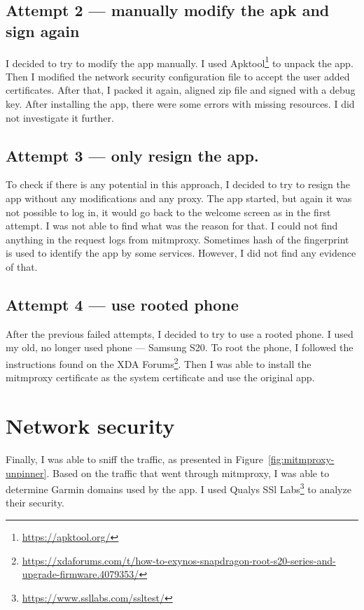 \subsection*{Attempt 2 — manually modify the apk and sign again}

I decided to try to modify the app manually.
I used Apktool\footnote{\url{https://apktool.org/}} to unpack the app.
Then I modified the network security configuration file to accept the user added certificates.
After that, I packed it again, aligned zip file and signed with a debug key.
After installing the app, there were some errors with missing resources.
I did not investigate it further.

\subsection*{Attempt 3 — only resign the app.}

To check if there is any potential in this approach, I decided to try to resign the app without any modifications and any proxy.
The app started, but again it was not possible to log in, it would go back to the welcome screen as in the first attempt.
I was not able to find what was the reason for that.
I could not find anything in the request logs from mitmproxy.
Sometimes hash of the fingerprint is used to identify the app by some services.
However, I did not find any evidence of that.

\subsection*{Attempt 4 — use rooted phone}
After the previous failed attempts, I decided to try to use a rooted phone.
I used my old, no longer used phone — Samsung S20.
To root the phone, I followed the instructions found on the XDA Forums\footnote{\url{https://xdaforums.com/t/how-to-exynos-snapdragon-root-s20-series-and-upgrade-firmware.4079353/}}.
Then I was able to install the mitmproxy certificate as the system certificate and use the original app.

\section{Network security}
Finally, I was able to sniff the traffic, as presented in Figure~\ref{fig:mitmproxy-unpinner}.
Based on the traffic that went through mitmproxy, I was able to determine Garmin domains used by the app.
I used Qualys SSl Labs\footnote{\url{https://www.ssllabs.com/ssltest/}} to analyze their security.

